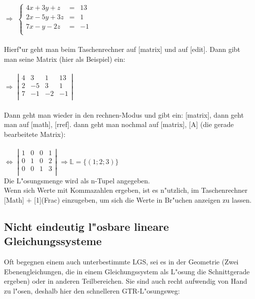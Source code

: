 $\Rightarrow$ $\left\{ \begin{array}{rcl}
4x+3y+z&=&13\\
2x-5y+3z& =& 1\\
7x-y-2z&=&-1\\
\end{array}\right.$\\
\\
Hierf"ur geht man beim Taschenrechner auf [matrix] und auf [edit]. Dann gibt man seine Matrix (hier als Beispiel) ein:\\
\\
$\Rightarrow$ $\left\vert \begin{array}{rccl}
4&3&1&13\\
2&-5&3& 1 \\
7&-1&-2&-1\\
\end{array}\right\vert$\\
\\
Dann geht man wieder in den rechnen-Modus und gibt ein:  [matrix], dann geht man auf [math], [rref]. dann geht man nochmal auf [matrix], [A] (die gerade bearbeitete Matrix):\\
\\
$\Leftrightarrow$ $\left\vert \begin{array}{rccl}
1&0&0&1\\
0&1&0&2 \\
0&0&1&3\\
\end{array}\right\vert$ \qquad $\Rightarrow \mathbb{L}=\{(1;2;3) \}$ \\

Die L"osungsmenge wird als n-Tupel angegeben.\\
Wenn sich Werte mit Kommazahlen ergeben, ist es n"utzlich, im Taschenrechner [Math] $+$ [1](Frac) einzugeben, um sich die Werte in Br"uchen anzeigen zu lassen.\\

	\subsection{Nicht eindeutig l"osbare lineare Gleichungssysteme}

Oft begegnen einem auch unterbestimmte LGS, sei es in der Geometrie (Zwei Ebenengleichungen, die in einem Gleichungssystem als L"osung die Schnittgerade ergeben) oder in anderen Teilbereichen. Sie sind auch recht aufwendig von Hand zu l"osen, deshalb hier den schnelleren GTR-L"osungsweg:\\


